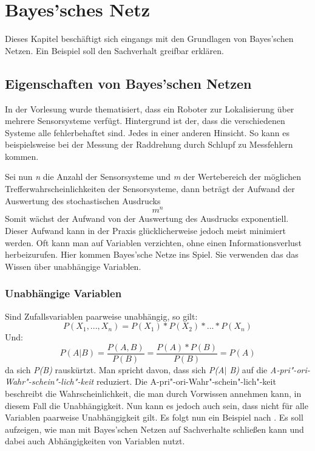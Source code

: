 \chapter{Bayes'sches Netz}
Dieses Kapitel beschäftigt sich eingangs mit den Grundlagen von Bayes'schen Netzen. Ein Beispiel soll den Sachverhalt greifbar erklären.

\section{Eigenschaften von Bayes'schen Netzen}
In der Vorlesung \cite{Strand17} wurde thematisiert, dass ein Roboter zur Lokalisierung über mehrere Sensorsysteme verfügt. Hintergrund ist der, dass die verschiedenen Systeme alle fehlerbehaftet sind. Jedes in einer anderen Hinsicht. So kann es beispielsweise bei der Messung der Raddrehung durch Schlupf zu Messfehlern kommen.

Sei nun \textit{n} die Anzahl der Sensorsysteme und \textit{m} der Wertebereich der möglichen Trefferwahrscheinlichkeiten der Sensorsysteme, dann beträgt der Aufwand der Auswertung des stochastischen Ausdrucks \[ m^n\] Somit wächst der Aufwand von der Auswertung des Ausdrucks exponentiell. Dieser Aufwand kann in der Praxis glücklicherweise jedoch meist minimiert werden. Oft kann man auf Variablen verzichten, ohne einen Informationsverlust herbeizurufen. Hier kommen Bayes'sche Netze ins Spiel. Sie verwenden das das Wissen über unabhängige Variablen. 
\subsection{Unabhängige Variablen}
Sind Zufallsvariablen paarweise unabhängig, so gilt: \[ P(X_1, ..., X_n) = P(X_1) * P(X_2) * ... * P(X_n)\] 
Und: \[ P(A\vert B) = \frac{P(A,B)}{P(B)} = \frac{P(A) * P(B)}{P(B)}  = P(A) \] da sich \textit{P(B)} rauskürtzt. Man spricht davon, dass sich \textit{P(A$\vert$ B)} auf die \textit{A-pri"-ori-Wahr"-schein"-lich"-keit} reduziert. Die A-pri"-ori-Wahr"-schein"-lich"-keit beschreibt die Wahrscheinlichkeit, die man durch Vorwissen annehmen kann, in diesem Fall die Unabhängigkeit. Nun kann es jedoch auch sein, dass nicht für alle Variablen paarweise Unabhängigkeit gilt. Es folgt nun ein Beispiel nach \cite{Perl88}. Es soll aufzeigen, wie man mit Bayes'schen Netzen auf Sachverhalte schließen kann und dabei auch Abhängigkeiten von Variablen nutzt. 

